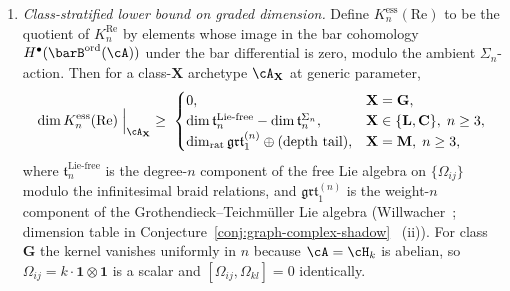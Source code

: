 \begin{theorem}
\begin{enumerate}[label=\textup{(\roman*)}]
\item \emph{Class-stratified lower bound on graded dimension.}
Define \(K^{\mathrm{ess}}_n(\mathrm{Re})\) to be the
quotient of \(K^{\mathrm{Re}}_n\) by elements whose image in
the bar cohomology $H^\bullet(\barB^{\mathrm{ord}}(\cA))$ under the
bar differential is zero, modulo the ambient $\Sigma_n$-action. Then
for a class-$\mathbf{X}$ archetype $\cA_\mathbf{X}$ at generic
parameter,
\begin{equation}\label{eq:ker-av-class-dim-lower-bound}
 \dim K^{\mathrm{ess}}_n(\mathrm{Re})\Bigm|_{\cA_\mathbf{X}}
 \;\geq\;
 \begin{cases}
 0, & \mathbf{X}=\mathbf{G},\\
 \dim\mathfrak{t}_n^{\mathrm{Lie}\text{-}\mathrm{free}}
 - \dim\mathfrak{t}_n^{\Sigma_n},
 & \mathbf{X}\in\{\mathbf{L},\mathbf{C}\},\;n\geq 3,\\
 \dim_{\mathrm{rat}}\mathfrak{grt}_1^{(n)}\oplus
 (\text{depth tail}),
 & \mathbf{X}=\mathbf{M},\;n\geq 3,
 \end{cases}
\end{equation}
where $\mathfrak{t}_n^{\mathrm{Lie}\text{-}\mathrm{free}}$ is the
degree-$n$ component of the free Lie algebra on
$\{\Omega_{ij}\}$ modulo the infinitesimal braid relations, and
$\mathfrak{grt}_1^{(n)}$ is the weight-$n$ component of the
Grothendieck--Teichm\"uller Lie algebra
\textup{(}Willwacher~\textup{\cite{Willwacher15}}; dimension table
in Conjecture~\textup{\ref{conj:graph-complex-shadow}}~%
\textup{(ii)}\textup{)}. For class~$\mathbf{G}$ the kernel vanishes
uniformly in $n$ because $\cA=\cH_k$ is abelian, so
$\Omega_{ij}=k\cdot\mathbf{1}\otimes\mathbf{1}$ is a scalar and
$[\Omega_{ij},\Omega_{kl}]=0$ identically.


\end{enumerate}
\end{theorem}
